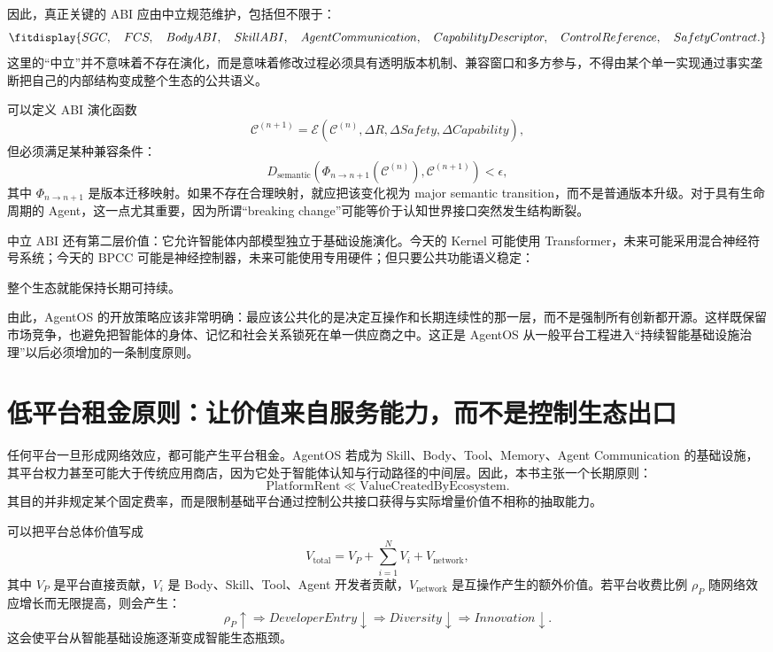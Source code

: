 因此，真正关键的 ABI 应由中立规范维护，包括但不限于：
\[
\fitdisplay{
SGC,\quad
FCS,\quad
BodyABI,\quad
SkillABI,\quad
AgentCommunication,\quad
CapabilityDescriptor,\quad
ControlReference,\quad
SafetyContract.
}
\]
这里的``中立''并不意味着不存在演化，而是意味着修改过程必须具有透明版本机制、兼容窗口和多方参与，不得由某个单一实现通过事实垄断把自己的内部结构变成整个生态的公共语义。

可以定义 ABI 演化函数
\[
\mathcal C^{(n+1)}
=
\mathcal E(
\mathcal C^{(n)},
\Delta R,
\Delta Safety,
\Delta Capability
),
\]
但必须满足某种兼容条件：
\[
D_{\mathrm{semantic}}
\left(
\Phi_{n\rightarrow n+1}
(\mathcal C^{(n)}),
\mathcal C^{(n+1)}
\right)
<
\epsilon,
\]
其中 $\Phi_{n\rightarrow n+1}$ 是版本迁移映射。如果不存在合理映射，就应把该变化视为 major semantic transition，而不是普通版本升级。对于具有生命周期的 Agent，这一点尤其重要，因为所谓``breaking change''可能等价于认知世界接口突然发生结构断裂。

中立 ABI 还有第二层价值：它允许智能体内部模型独立于基础设施演化。今天的 Kernel 可能使用 Transformer，未来可能采用混合神经符号系统；今天的 BPCC 可能是神经控制器，未来可能使用专用硬件；但只要公共功能语义稳定：
\begin{statementbox}
\centering
{}
\end{statementbox}
整个生态就能保持长期可持续。

由此，AgentOS 的开放策略应该非常明确：最应该公共化的是决定互操作和长期连续性的那一层，而不是强制所有创新都开源。这样既保留市场竞争，也避免把智能体的身体、记忆和社会关系锁死在单一供应商之中。这正是 AgentOS 从一般平台工程进入``持续智能基础设施治理''以后必须增加的一条制度原则。

\section{低平台租金原则：让价值来自服务能力，而不是控制生态出口}

任何平台一旦形成网络效应，都可能产生平台租金。AgentOS 若成为 Skill、Body、Tool、Memory、Agent Communication 的基础设施，其平台权力甚至可能大于传统应用商店，因为它处于智能体认知与行动路径的中间层。因此，本书主张一个长期原则：
\[
\boxed{
\text{PlatformRent}
\ll
\text{ValueCreatedByEcosystem}.
}
\]
其目的并非规定某个固定费率，而是限制基础平台通过控制公共接口获得与实际增量价值不相称的抽取能力。

可以把平台总体价值写成
\[
V_{\mathrm{total}}
=
V_P
+
\sum_{i=1}^{N}V_i
+
V_{\mathrm{network}},
\]
其中 $V_P$ 是平台直接贡献，$V_i$ 是 Body、Skill、Tool、Agent 开发者贡献，$V_{\mathrm{network}}$ 是互操作产生的额外价值。若平台收费比例 $\rho_P$ 随网络效应增长而无限提高，则会产生：
\[
\rho_P\uparrow
\Rightarrow
DeveloperEntry\downarrow
\Rightarrow
Diversity\downarrow
\Rightarrow
Innovation\downarrow.
\]
这会使平台从智能基础设施逐渐变成智能生态瓶颈。


